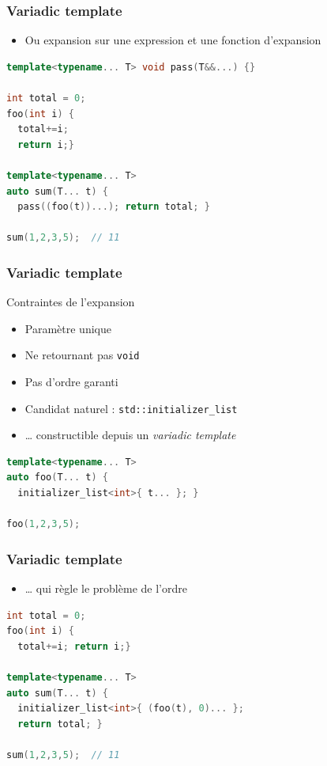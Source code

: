\documentclass[C++.tex]{subfiles}
\begin{document}
\begin{frame}[fragile]
	\frametitle{Variadic template}
	\begin{itemize}
		\item Ou expansion sur une expression et une fonction d'expansion
	\end{itemize}

	\begin{lstlisting}[language=C++]
template<typename... T> void pass(T&&...) {}

int total = 0;
foo(int i) {
  total+=i; 
  return i;}

template<typename... T>
auto sum(T... t) {
  pass((foo(t))...); return total; }

sum(1,2,3,5);  // 11\end{lstlisting}
\end{frame}

\begin{frame}[fragile]
	\frametitle{Variadic template}
	\begin{alertblock}{Contraintes de l'expansion}
		\begin{itemize}
			\item Paramètre unique
			\item Ne retournant pas \lstinline|void|
			\item Pas d'ordre garanti
		\end{itemize}
	\end{alertblock}

	\begin{itemize}
		\item Candidat naturel : \lstinline|std::initializer_list|
		\item \ldots{} constructible depuis un \textit{variadic template}
	\end{itemize}

	\begin{lstlisting}[language=C++]
template<typename... T>
auto foo(T... t) {
  initializer_list<int>{ t... }; }

foo(1,2,3,5);\end{lstlisting}
\end{frame}

\begin{frame}[fragile]
	\frametitle{Variadic template}
	\begin{itemize}
		\item \ldots{} qui règle le problème de l'ordre
	\end{itemize}

	\begin{lstlisting}[language=C++]
int total = 0;
foo(int i) {
  total+=i; return i;}

template<typename... T>
auto sum(T... t) {
  initializer_list<int>{ (foo(t), 0)... };
  return total; }

sum(1,2,3,5);  // 11\end{lstlisting}

\end{frame}
\end{document}
